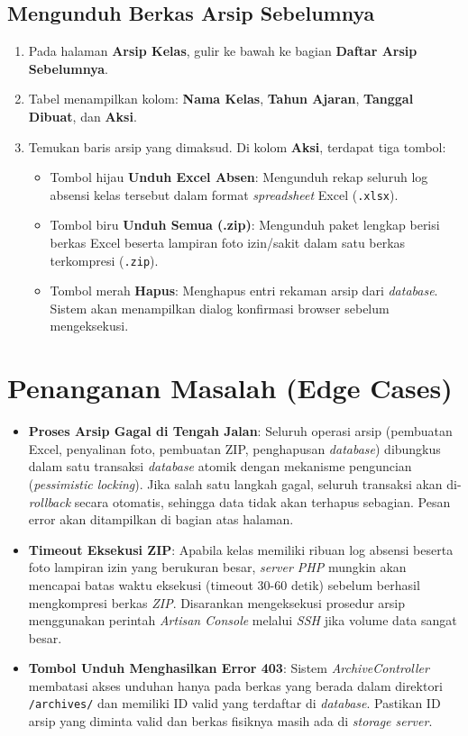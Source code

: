 \subsection{Mengunduh Berkas Arsip Sebelumnya}
\begin{enumerate}
    \item Pada halaman \textbf{Arsip Kelas}, gulir ke bawah ke bagian \textbf{Daftar Arsip Sebelumnya}.
    \item Tabel menampilkan kolom: \textbf{Nama Kelas}, \textbf{Tahun Ajaran}, \textbf{Tanggal Dibuat}, dan \textbf{Aksi}.
    \item Temukan baris arsip yang dimaksud. Di kolom \textbf{Aksi}, terdapat tiga tombol:
    \begin{itemize}
        \item Tombol hijau \textbf{Unduh Excel Absen}: Mengunduh rekap seluruh log absensi kelas tersebut dalam format \textit{spreadsheet} Excel (\texttt{.xlsx}).
        \item Tombol biru \textbf{Unduh Semua (.zip)}: Mengunduh paket lengkap berisi berkas Excel beserta lampiran foto izin/sakit dalam satu berkas terkompresi (\texttt{.zip}).
        \item Tombol merah \textbf{Hapus}: Menghapus entri rekaman arsip dari \textit{database}. Sistem akan menampilkan dialog konfirmasi browser sebelum mengeksekusi.
    \end{itemize}
\end{enumerate}

\section{Penanganan Masalah (Edge Cases)}
\begin{itemize}
    \item \textbf{Proses Arsip Gagal di Tengah Jalan}: Seluruh operasi arsip (pembuatan Excel, penyalinan foto, pembuatan ZIP, penghapusan \textit{database}) dibungkus dalam satu transaksi \textit{database} atomik dengan mekanisme penguncian (\textit{pessimistic locking}). Jika salah satu langkah gagal, seluruh transaksi akan di-\textit{rollback} secara otomatis, sehingga data tidak akan terhapus sebagian. Pesan error akan ditampilkan di bagian atas halaman.
    \item \textbf{Timeout Eksekusi ZIP}: Apabila kelas memiliki ribuan log absensi beserta foto lampiran izin yang berukuran besar, \textit{server PHP} mungkin akan mencapai batas waktu eksekusi (timeout 30-60 detik) sebelum berhasil mengkompresi berkas \textit{ZIP}. Disarankan mengeksekusi prosedur arsip menggunakan perintah \textit{Artisan Console} melalui \textit{SSH} jika volume data sangat besar.
    \item \textbf{Tombol Unduh Menghasilkan Error 403}: Sistem \textit{ArchiveController} membatasi akses unduhan hanya pada berkas yang berada dalam direktori \texttt{/archives/} dan memiliki ID valid yang terdaftar di \textit{database}. Pastikan ID arsip yang diminta valid dan berkas fisiknya masih ada di \textit{storage server}.
\end{itemize}
